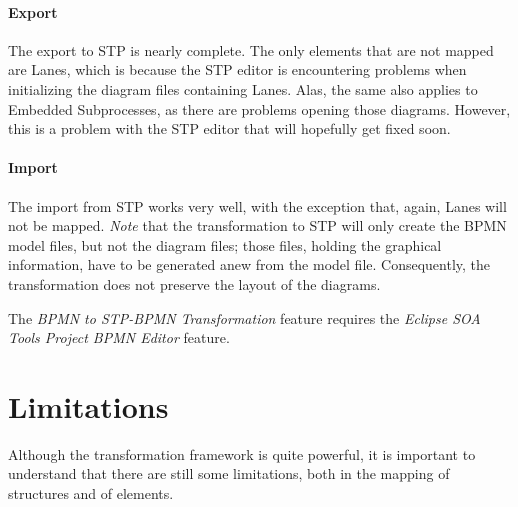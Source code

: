 \paragraph{Export}
The export to STP is nearly complete.  The only elements that are not mapped are
Lanes, which is because the STP editor is encountering problems when initializing
the diagram files containing Lanes.  Alas, the same also applies to Embedded
Subprocesses, as there are problems opening those diagrams.  However, this is a
problem with the STP editor that will hopefully get fixed soon.

\paragraph{Import}
The import from STP works very well, with the exception that, again, Lanes will
not be mapped. \emph{Note} that the transformation to STP will only create the
BPMN model files, but not the diagram files; those files, holding the graphical
information, have to be generated anew from the model file.  Consequently, the
transformation does not preserve the layout of the diagrams.

The \emph{BPMN to STP-BPMN Transformation} feature requires the \emph{Eclipse SOA
Tools Project BPMN Editor} feature.



\section{Limitations}

Although the transformation framework is quite powerful, it is important to
understand that there are still some limitations, both in the mapping of
structures and of elements.

